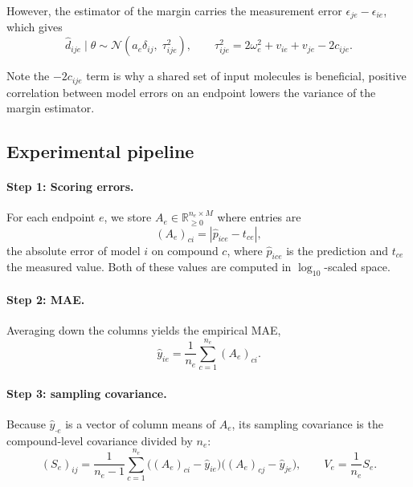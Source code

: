 \documentclass{article}
\begin{document}
However, the estimator of the margin carries the measurement error $\epsilon_{je} - \epsilon_{ie}$, which gives
\begin{equation}
  \hat{d}_{ije} \mid \theta \sim \mathcal{N}\!\left(a_e\delta_{ij},\; \tau_{ije}^2\right),
  \qquad
  \tau_{ije}^2 = 2\omega_e^2 + v_{ie} + v_{je} - 2c_{ije}.
\end{equation}

Note the $-2c_{ije}$ term is why a shared set of input molecules is beneficial, positive correlation between model errors on an endpoint lowers the variance of the margin estimator.

\subsection{Experimental pipeline}
\label{app:pipeline}

\paragraph{Step 1: Scoring errors.} For each endpoint $e$, we store $A_e \in \mathbb{R}^{n_e \times M}_{\geq 0}$ where entries are
\begin{equation}
  (A_e)_{ci} = \left| \hat{p}_{ice} - t_{ce} \right|,
\end{equation}
the absolute error of model $i$ on compound $c$, where $\hat{p}_{ice}$ is the
prediction and $t_{ce}$ the measured value. Both of these values are computed in $\log_{10}$-scaled space.

\paragraph{Step 2: MAE.}
Averaging down the columns yields the empirical MAE,
\begin{equation}
    \hat{y}_{ie} = \frac{1}{n_e} \sum_{c=1}^{n_e} (A_e)_{ci}.
\end{equation}

\paragraph{Step 3: sampling covariance.}
Because $\hat{y}_{\cdot e}$ is a vector of column means of $A_e$, its sampling
covariance is the compound-level covariance divided by $n_e$:
\begin{equation}
  (S_e)_{ij} = \frac{1}{n_e - 1}\sum_{c=1}^{n_e}
    \bigl((A_e)_{ci} - \hat{y}_{ie}\bigr)\bigl((A_e)_{cj} - \hat{y}_{je}\bigr),
  \qquad V_e = \frac{1}{n_e} S_e .
\end{equation}
\end{document}
